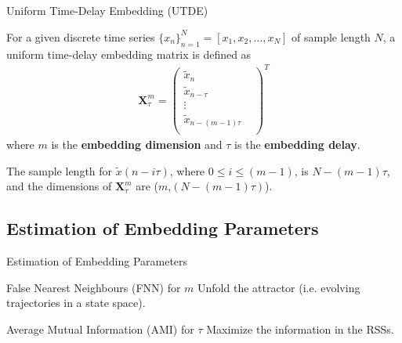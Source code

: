 \subsection{}
{

\begin{frame}{Uniform Time-Delay Embedding (UTDE)}

For a given discrete time series $\{x_n\}_{n=1}^{N} = [x_1 , x_2, \dots, x_N]$
of sample length $N$, a uniform time-delay embedding matrix is defined as 
\begin{eqnarray*}
 \mathbf{X}^{m}_{\tau}
  = \begin{pmatrix} \nonumber
      \tilde{x}_n  & \\
      \tilde{x}_{n-\tau}  & \\
      \vdots  &  \\
      \tilde{x}_{n-(m-1)\tau} & \\
      \end{pmatrix}^T
\end{eqnarray*}
where $m$ is the \textbf{embedding dimension}  and  $\tau$ is the \textbf{ embedding delay}.


The sample length for $\tilde{x}(n-i\tau)$, where $0 \leq i \leq (m-1)$, is $N-(m-1)\tau$,
and the dimensions of $\mathbf{X}^{m}_{\tau}$ are ($m$,$(N-(m-1)\tau)$).

\end{frame}
}


\subsection{Estimation of Embedding Parameters}
{

\begin{frame}{Estimation of Embedding Parameters }

\begin{block}{False Nearest Neighbours (FNN) for $m$}
Unfold the attractor (i.e. evolving trajectories
in a state space).
\end{block}

\begin{block}{Average Mutual Information (AMI) for $\tau$}
Maximize the information in the RSSs.
\end{block}
	
\end{frame}
}



